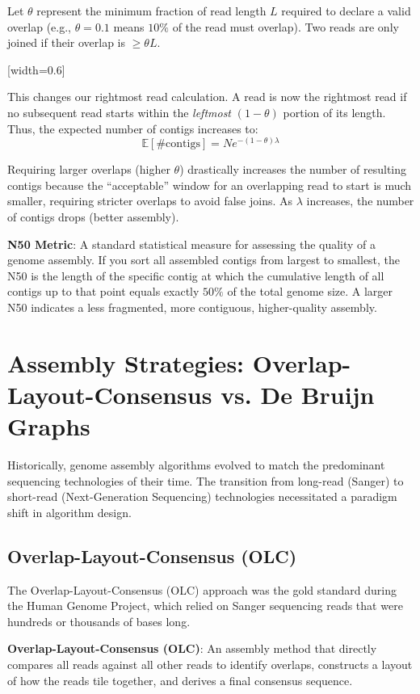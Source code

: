 Let $\theta$ represent the minimum fraction of read length $L$ required to declare a valid overlap (e.g., $\theta = 0.1$ means $10\%$ of the read must overlap). Two reads are only joined if their overlap is $\ge \theta L$.

[width=0.6\textwidth]

This changes our rightmost read calculation. A read is now the rightmost read if no subsequent read starts within the \textit{leftmost} $(1-\theta)$ portion of its length. Thus, the expected number of contigs increases to:
\[ \mathbb{E}[\#\text{contigs}] = N e^{-(1-\theta) \lambda} \]

\sta Requiring larger overlaps (higher $\theta$) drastically increases the number of resulting contigs because the ``acceptable'' window for an overlapping read to start is much smaller, requiring stricter overlaps to avoid false joins. As $\lambda$ increases, the number of contigs drops (better assembly).

\begin{important}
    \textbf{N50 Metric}: A standard statistical measure for assessing the quality of a genome assembly. If you sort all assembled contigs from largest to smallest, the N50 is the length of the specific contig at which the cumulative length of all contigs up to that point equals exactly $50\%$ of the total genome size. A larger N50 indicates a less fragmented, more contiguous, higher-quality assembly.
\end{important}


\section{Assembly Strategies: Overlap-Layout-Consensus vs. De Bruijn Graphs}
Historically, genome assembly algorithms evolved to match the predominant sequencing technologies of their time. The transition from long-read (Sanger) to short-read (Next-Generation Sequencing) technologies necessitated a paradigm shift in algorithm design.

\subsection{Overlap-Layout-Consensus (OLC)}
The Overlap-Layout-Consensus (OLC) approach was the gold standard during the Human Genome Project, which relied on Sanger sequencing reads that were hundreds or thousands of bases long.

\begin{important}
    \textbf{Overlap-Layout-Consensus (OLC)}: An assembly method that directly compares all reads against all other reads to identify overlaps, constructs a layout of how the reads tile together, and derives a final consensus sequence.
\end{important}

